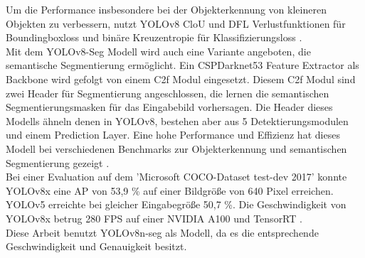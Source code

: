 {{	Um die Performance insbesondere bei der Objekterkennung von kleineren Objekten zu verbessern, nutzt YOLOv8 CloU \citep{Zheng2020} und DFL \citep{Li2020} Verlustfunktionen für Boundingboxloss und binäre Kreuzentropie für Klassifizierungsloss \citep{Terven2023}. \\

	Mit dem YOLOv8-Seg Modell wird auch eine Variante angeboten, die semantische Segmentierung ermöglicht. Ein CSPDarknet53 Feature Extractor als Backbone wird gefolgt von einem C2f Modul eingesetzt. Diesem C2f Modul sind zwei Header für Segmentierung angeschlossen, die lernen die semantischen Segmentierungsmasken für das Eingabebild vorhersagen. Die Header dieses Modells ähneln denen in  YOLOv8, bestehen aber aus 5 Detektierungsmodulen und einem Prediction Layer. Eine hohe Performance und Effizienz hat dieses Modell bei verschiedenen Benchmarks zur Objekterkennung und semantischen Segmentierung gezeigt \citep{Terven2023}. \\
	Bei einer Evaluation auf dem 'Microsoft COCO-Dataset test-dev 2017' konnte YOLOv8x eine AP von 53,9 \% auf einer Bildgröße von 640 Pixel erreichen. YOLOv5 erreichte bei gleicher Eingabegröße 50,7 \%. Die Geschwindigkeit von YOLOv8x betrug 280 FPS auf einer NVIDIA A100 und TensorRT \citep{Terven2023}.\\

	Diese Arbeit benutzt YOLOv8n-seg als Modell, da es die entsprechende Geschwindigkeit und Genauigkeit besitzt.
	}
}

\clearpage


